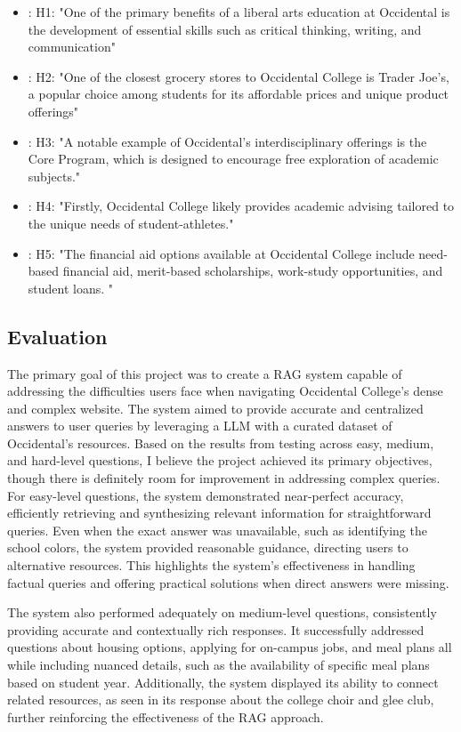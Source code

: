 \documentclass[10pt,twocolumn]{article}
\begin{document}
\begin{itemize}
\item: H1: "One of the primary benefits of a liberal arts education at Occidental is the development of essential skills such as critical thinking, writing, and communication"
\item: H2: "One of the closest grocery stores to Occidental College is Trader Joe's, a popular choice among students for its affordable prices and unique product offerings"
\item: H3: "A notable example of Occidental's interdisciplinary offerings is the Core Program, which is designed to encourage free exploration of academic subjects."
\item: H4: "Firstly, Occidental College likely provides academic advising tailored to the unique needs of student-athletes."
\item: H5: "The financial aid options available at Occidental College include need-based financial aid, merit-based scholarships, work-study opportunities, and student loans. "
\end{itemize}

\subsection{Evaluation}
\indent The primary goal of this project was to create a RAG system capable of addressing the difficulties users face when navigating Occidental College’s dense and complex website. The system aimed to provide accurate and centralized answers to user queries by leveraging a LLM with a curated dataset of Occidental’s resources. Based on the results from testing across easy, medium, and hard-level questions, I believe the project achieved its primary objectives, though there is definitely room for improvement in addressing complex queries. For easy-level questions, the system demonstrated near-perfect accuracy, efficiently retrieving and synthesizing relevant information for straightforward queries. Even when the exact answer was unavailable, such as identifying the school colors, the system provided reasonable guidance, directing users to alternative resources. This highlights the system’s effectiveness in handling factual queries and offering practical solutions when direct answers were missing.

\indent The system also performed adequately on medium-level questions, consistently providing accurate and contextually rich responses. It successfully addressed questions about housing options, applying for on-campus jobs, and meal plans all while including nuanced details, such as the availability of specific meal plans based on student year. Additionally, the system displayed its ability to connect related resources, as seen in its response about the college choir and glee club, further reinforcing the effectiveness of the RAG approach.
\end{document}

